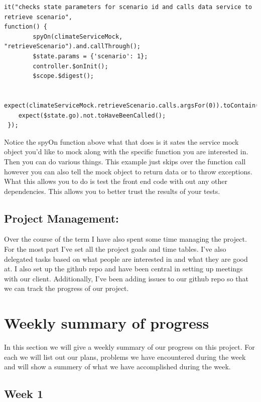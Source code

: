 \documentclass[onecolumn, draftclsnofoot,10pt, compsoc]{article}
\begin{document}
		\begin{lstlisting}
it("checks state parameters for scenario id and calls data service to retrieve scenario", 
function() {
		spyOn(climateServiceMock, "retrieveScenario").and.callThrough();
		$state.params = {'scenario': 1};
		controller.$onInit();
		$scope.$digest();

    expect(climateServiceMock.retrieveScenario.calls.argsFor(0)).toContain(1);
    expect($state.go).not.toHaveBeenCalled();
 });
		\end{lstlisting}
		Notice the spyOn function above what that does is it sates the service mock object you'd like to mock along with the specific function you are interested in. Then you can do various things. This example just skips over the function call however you can also tell the mock object to return data or to throw exceptions. What this allows you to do is test the front end code with out any other dependencies. This allows you to better trust the results of your tests.\\
		
		
		\subsection{Project Management:}
		Over the course of the term I have also spent some time managing the project. For the most part I've set all the project goals and time tables. I've also delegated tasks based on what people are interested in and what they are good at. I also set up the github repo and have been central in setting up meetings with our client. Additionally, I've been adding issues to our github repo so that we can track the progress of our project.\\
		
\section{Weekly summary of progress}
	   In this section we will give a weekly summary of our progress on this project. For each we will list out our plans, problems we have encountered during the week and will show a summery of what we have accomplished during the week.\\

		\subsection{Week 1}
\end{document}
